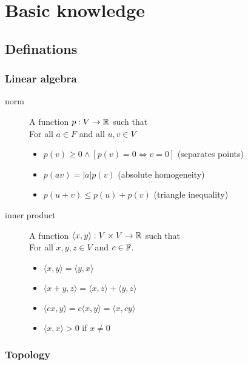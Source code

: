 \section{Basic knowledge}

\subsection{Definations}
\subsubsection{Linear algebra}


\begin{description}
\item[norm] A function $p:V\to{\mathbb R}$ such that\label{def:norm}\hfill\\
	For all $a\in F$ and all $u,v\in V$
	\begin{itemize}
	\item $p(v) \geq 0 \wedge [p(v) = 0 \iff v=0]$ (separates points)
	\item $p(av)=|a|p(v)$ (absolute homogeneity)
	\item $p(u + v) \leq p(u) + p(v)$ (triangle inequality)
	\end{itemize}

\item[inner product]\label{def:innerprod}
	A function $\langle x,y\rangle : V\times V \to {\mathbb R}$ such that \hfill\\
	For all $x,y,z \in V$ and $c\in{\mathbb F}$.
	\begin{itemize}
	\item $\langle x,y\rangle = \langle y,x\rangle$
	\item $\langle x+y,z\rangle = \langle x,z\rangle + \langle y,z\rangle$
	\item $\langle cx,y\rangle = c\langle x,y\rangle = \langle x,cy\rangle$
	\item $\langle x,x\rangle > 0$ if $x\neq 0$
	\end{itemize}
\end{description}

\subsubsection{Topology}

